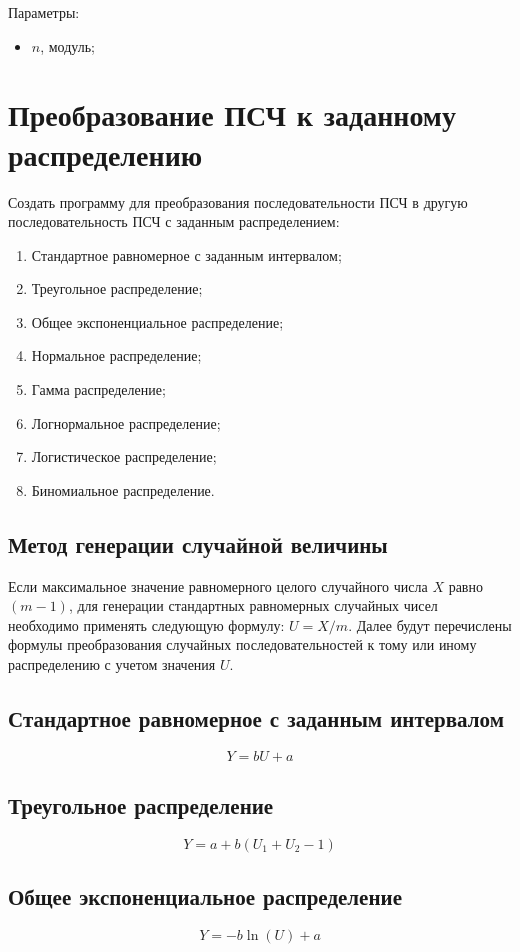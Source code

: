 \documentclass[bachelor, och, labwork]{SCWorks}
\begin{document}
Параметры:
\begin{itemize}
  \item $n$, модуль;
\end{itemize}

\section{Преобразование ПСЧ к заданному распределению}
Создать программу для преобразования последовательности ПСЧ в другую последовательность
ПСЧ с заданным распределением:
\begin{enumerate}
  \item Стандартное равномерное с заданным интервалом;
  \item Треугольное распределение;
  \item Общее экспоненциальное распределение;
  \item Нормальное распределение;
  \item Гамма распределение;
  \item Логнормальное распределение;
  \item Логистическое распределение;
  \item Биномиальное распределение.
\end{enumerate}

\subsection{Метод генерации случайной величины}
Если максимальное значение равномерного целого случайного числа $X$ равно $(m -
1)$, для генерации стандартных равномерных случайных чисел необходимо применять
следующую формулу: $U = X / m$. Далее будут перечислены формулы преобразования
случайных последовательностей к тому или иному распределению с учетом значения
$U$.

\subsection{Стандартное равномерное с заданным интервалом}
\[ Y = bU + a \]

\subsection{Треугольное распределение}
\[ Y = a + b(U_1 + U_2 - 1) \]

\subsection{Общее экспоненциальное распределение}
\[ Y = -b \ln(U) + a \]
\end{document}
